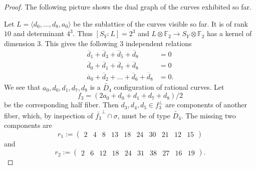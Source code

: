 \documentclass[a4paper]{amsart}
\theoremstyle{definition}
\theoremstyle{plain}
\newcommand{\FF}{\mathbb{F}}
\begin{document}
\begin{proof}
The following picture shows the dual graph of the curves exhibited so far.
\begin{center}
\end{center}
Let $L=\langle d_0,\dots,d_8,a_0\rangle$ be the sublattice of the curves visible so far.
It is of rank $10$ and determinant $4^3$. Thus $[S_Y:L]=2^3$ and $L\otimes \FF_2 \to S_Y\otimes \FF_2$ has a kernel of dimension $3$.
This gives the following $3$ independent relations
\begin{align}\label{eqn:D8_relation1}
\overline{d}_1+\overline{d}_3+\overline{d}_5+\overline{d}_8 &= 0 \\
\overline{d}_0+\overline{d}_1+\overline{d}_7+\overline{d}_8 &= 0 \label{eqn:D8_relation2}\\
\overline{a}_0+\overline{d}_2+\dots+\overline{d}_6+\overline{d}_8 &= 0 . \label{eqn:D8_relation3}
\end{align}
We see that $a_0,d_0,d_1,d_7,d_8$ is a $\widetilde{D_4}$ configuration of rational curves. Let 
\[f_3= (2a_0+d_0+d_1+d_7+d_8)/2\] be the corresponding half fiber. Then $d_3,d_4,d_5 \in f_3^\perp$ are components of another fiber, which, by inspection of $\overline{f_3}^\perp \cap \sigma$, must be of type $\widetilde{D_4}$. The missing two components are 
\[
r_1 := \begin{pmatrix}
2&  4&  8&  13&  18&  24&  30&  21&  12&  15
\end{pmatrix}
\]
and
\[
r_2 :=\begin{pmatrix}
2&  6&  12&  18&  24&  31&  38&  27&  16&  19\end{pmatrix}.
\]
\end{proof}
\end{document}
